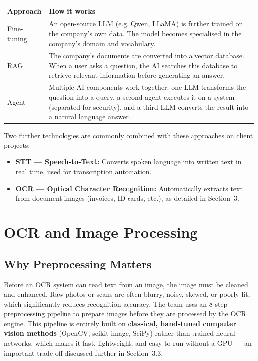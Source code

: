 \documentclass[12pt, a4paper]{article}
\begin{document}
\vspace{0.5em}
\begin{tabularx}{\textwidth}{lX}
\toprule
\textbf{Approach} & \textbf{How it works} \\
\midrule
Fine-tuning & An open-source LLM (e.g. Qwen, LLaMA) is further trained on the company's own data. The model becomes specialised in the company's domain and vocabulary. \\
\addlinespace
RAG & The company's documents are converted into a vector database. When a user asks a question, the AI searches this database to retrieve relevant information before generating an answer. \\
\addlinespace
Agent & Multiple AI components work together: one LLM transforms the question into a query, a second agent executes it on a system (separated for security), and a third LLM converts the result into a natural language answer. \\
\bottomrule
\end{tabularx}

\vspace{1em}

Two further technologies are commonly combined with these approaches on client projects:

\begin{itemize}
  \item \textbf{STT --- Speech-to-Text:} Converts spoken language into written text in real time, used for transcription automation.
  \item \textbf{OCR --- Optical Character Recognition:} Automatically extracts text from document images (invoices, ID cards, etc.), as detailed in Section~3.
\end{itemize}

\section{\color{navyblue} OCR and Image Processing}

\subsection{Why Preprocessing Matters}

Before an OCR system can read text from an image, the image must be cleaned and enhanced. Raw photos or scans are often blurry, noisy, skewed, or poorly lit, which significantly reduces recognition accuracy. The team uses an 8-step preprocessing pipeline to prepare images before they are processed by the OCR engine. This pipeline is entirely built on \textbf{classical, hand-tuned computer vision methods} (OpenCV, scikit-image, SciPy) rather than trained neural networks, which makes it fast, lightweight, and easy to run without a GPU --- an important trade-off discussed further in Section~3.3.
\end{document}
